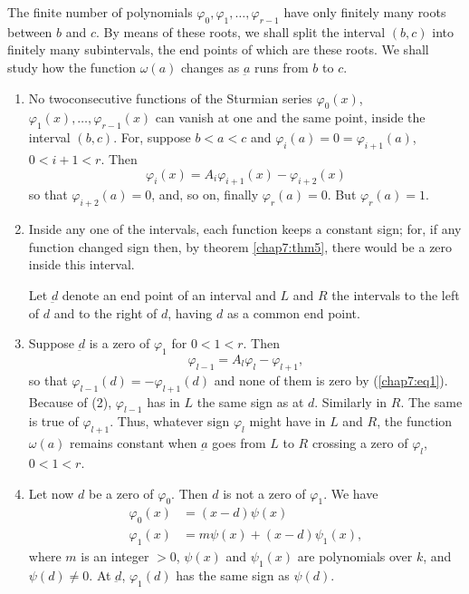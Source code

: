 The finite number of polynomials $\varphi_0, \varphi_1, \ldots,
\varphi_{r-1}$ have only finitely many roots between $b$ and $c$. By
means of these roots, we shall split the interval $(b,c)$ into
finitely many subintervals, the end points of which are these
roots. We shall study how the function $\omega(a)$ changes as
$\underbar{a}$ runs from $b$ to $c$.
\begin{enumerate}[1)]
\item No two\pageoriginale consecutive functions of the Sturmian series
  $\varphi_0(x)$,\break $\varphi_1(x), \ldots,\varphi_{r-1}(x)$ can vanish at
  one and the same point, inside the interval $(b,c)$. For, suppose
  $b<a<c$ and $\varphi_i(a) = 0 = \varphi_{i+1}(a)$, $0< i + 1
  <r$. Then
$$
\varphi_i (x) = A_i \varphi_{i+1} (x) - \varphi_{i+2}(x)
$$
so that $\varphi_{i+2}(a)=0$, and, so on, finally
$\varphi_r(a)=0$. But $\varphi_r (a)=1$.

\item Inside any one of the intervals, each function keeps a constant
  sign; for, if any function changed sign then, by theorem
  \ref{chap7:thm5}, there   would be a zero inside this interval. 

Let $\underbar{d}$ denote an end point of an interval and $L$ and $R$
the intervals to the left of $d$ and to the right of $d$, having $d$
as a common end point.

\item Suppose $\underbar{d}$ is a zero of $\varphi_1$ for $0<
  1<r$. Then
$$
\varphi_{l-1} = A_l \varphi_l - \varphi_{l+1},
$$
so that $\varphi_{l-1}(d) = - \varphi_{l+1}(d)$ and none of them is
zero by (\ref{chap7:eq1}). Because of (2), $\varphi_{l-1}$ has in
$L$ the same sign 
as at $d$. Similarly in $R$. The same is true of
$\varphi_{l+1}$. Thus, whatever sign $\varphi_l$ might have in $L$ and
$R$, the function $\omega(a)$  remains constant when $\underbar{a}$
goes from $L$ to $R$ crossing a zero of $\varphi_l$, $0<1<r$.

\item Let now $d$ be a zero of $\varphi_0$. Then $d$ is not a zero of
  $\varphi_1$. We have
\begin{align*}
\varphi_0 (x) & = (x-d) \psi(x)\\
\varphi_1(x) & = m \psi (x) + (x-d) \psi_1(x),
\end{align*}
where $m$ is an integer $>0$, $\psi(x)$ and $\psi_1(x)$ are
polynomials over $k$, and $\psi(d) \neq 0$. At $\underbar{d}$,
$\varphi_1(d)$ has the same sign as $\psi(d)$.
\end{enumerate}

